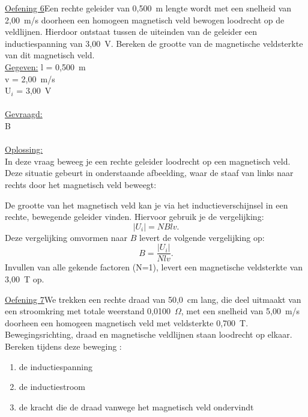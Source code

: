 \documentclass[a4paper,12pt,twoside]{article}%
\begin{document}
\underline{Oefening 6}\newline	Een rechte geleider van 0,500~m lengte wordt met een snelheid van 2,00~m/s doorheen een homogeen magnetisch veld bewogen loodrecht op de veldlijnen. Hierdoor ontstaat tussen de uiteinden van de geleider een inductiespanning van 3,00~V. 
Bereken de grootte van de magnetische veldsterkte van dit magnetisch veld.\\

\underline{Gegeven:}\newline
l = 0,500~m\\
v = 2,00~m/s\\
U$_i$ = 3,00~V\\
\\
\underline{Gevraagd:}\\
B\\ \\
\underline{Oplossing:}\\
In deze vraag beweeg je een rechte geleider loodrecht op een magnetisch veld. Deze situatie gebeurt in onderstaande afbeelding, waar de staaf van links naar rechts  door het magnetisch veld beweegt:
\begin{figure}[h]
	\centering
\end{figure}

De grootte van het magnetisch veld kan je via het inductieverschijnsel in een rechte, bewegende geleider vinden. Hiervoor gebruik je de vergelijking:\[\left|U_i\right|= NBlv.\]
Deze vergelijking omvormen naar $B$ levert de volgende vergelijking op:
\[B = \frac{\left|U_i\right|}{Nlv}.\]
Invullen van alle gekende factoren (N=1), levert een magnetische veldsterkte van 3,00~T op.


\newpage






\underline{Oefening 7}\newline	We trekken een rechte draad van 50,0~cm lang, die deel uitmaakt van een stroomkring met totale weerstand 0,0100~$\Omega$, met een snelheid van 5,00~m/s doorheen een homogeen magnetisch veld met veldsterkte 0,700~T. Bewegingsrichting, draad en magnetische veldlijnen staan loodrecht op elkaar. 
Bereken tijdens deze beweging :
\begin{enumerate}
	\item de inductiespanning
	\item	de inductiestroom
	\item	de kracht die de draad vanwege het magnetisch veld ondervindt
\end{enumerate} 
\end{document}
